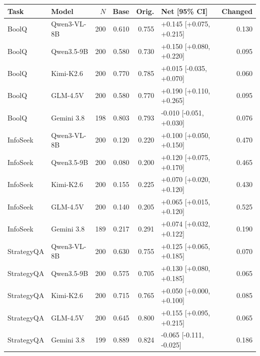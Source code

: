 \begin{tabular}{llrrrlr}
\toprule
Task & Model & $N$ & Base & Orig. & Net [95\% CI] & Changed \\
\midrule
BoolQ & Qwen3-VL-8B & 200 & 0.610 & 0.755 & +0.145 [+0.075, +0.215] & 0.130 \\
BoolQ & Qwen3.5-9B & 200 & 0.580 & 0.730 & +0.150 [+0.080, +0.220] & 0.095 \\
BoolQ & Kimi-K2.6 & 200 & 0.770 & 0.785 & +0.015 [-0.035, +0.070] & 0.060 \\
BoolQ & GLM-4.5V & 200 & 0.580 & 0.770 & +0.190 [+0.110, +0.265] & 0.095 \\
BoolQ & Gemini 3.8 & 198 & 0.803 & 0.793 & -0.010 [-0.051, +0.030] & 0.076 \\
InfoSeek & Qwen3-VL-8B & 200 & 0.120 & 0.220 & +0.100 [+0.050, +0.150] & 0.470 \\
InfoSeek & Qwen3.5-9B & 200 & 0.080 & 0.200 & +0.120 [+0.075, +0.170] & 0.465 \\
InfoSeek & Kimi-K2.6 & 200 & 0.155 & 0.225 & +0.070 [+0.020, +0.120] & 0.430 \\
InfoSeek & GLM-4.5V & 200 & 0.140 & 0.205 & +0.065 [+0.015, +0.120] & 0.525 \\
InfoSeek & Gemini 3.8 & 189 & 0.217 & 0.291 & +0.074 [+0.032, +0.122] & 0.190 \\
StrategyQA & Qwen3-VL-8B & 200 & 0.630 & 0.755 & +0.125 [+0.065, +0.185] & 0.070 \\
StrategyQA & Qwen3.5-9B & 200 & 0.575 & 0.705 & +0.130 [+0.080, +0.185] & 0.065 \\
StrategyQA & Kimi-K2.6 & 200 & 0.715 & 0.765 & +0.050 [+0.000, +0.100] & 0.085 \\
StrategyQA & GLM-4.5V & 200 & 0.645 & 0.800 & +0.155 [+0.095, +0.215] & 0.065 \\
StrategyQA & Gemini 3.8 & 199 & 0.889 & 0.824 & -0.065 [-0.111, -0.025] & 0.186 \\
\bottomrule
\end{tabular}
